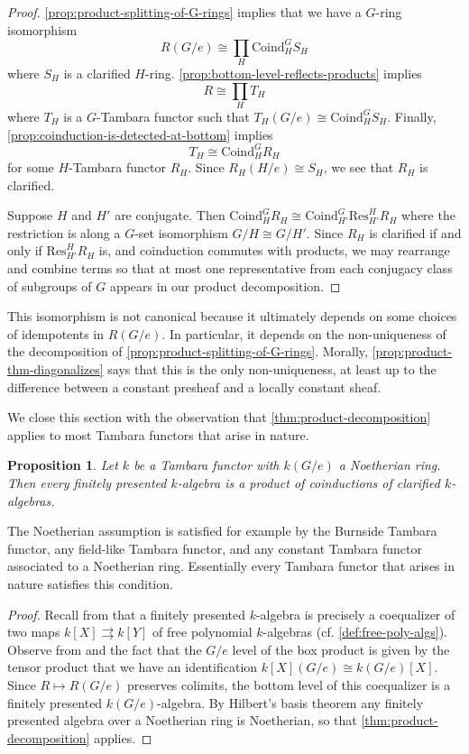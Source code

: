 \documentclass[11pt,dvipsnames]{amsart}
\newtheorem{proposition}[theorem]{Proposition}
\theoremstyle{BoldRemark}
\begin{document}
\begin{proof}
	\cref{prop:product-splitting-of-G-rings} implies that we have a $G$-ring isomorphism \[ R(G/e) \cong \prod_H \mathrm{Coind}_H^G S_H \] where $S_H$ is a clarified $H$-ring. \cref{prop:bottom-level-reflects-products} implies \[ R \cong \prod_H T_H \] where $T_H$ is a $G$-Tambara functor such that $T_H(G/e) \cong \mathrm{Coind}_H^G S_H$. Finally, \cref{prop:coinduction-is-detected-at-bottom} implies \[ T_H \cong \mathrm{Coind}_H^G R_H \] for some $H$-Tambara functor $R_H$. Since $R_H(H/e) \cong S_H$, we see that $R_H$ is clarified.
	
	Suppose $H$ and $H'$ are conjugate. Then $\mathrm{Coind}_H^G R_H \cong \mathrm{Coind}_{H'}^G \mathrm{Res}_{H'}^H R_H$ where the restriction is along a $G$-set isomorphism $G/H \cong G/H'$. Since $R_H$ is clarified if and only if $\mathrm{Res}_{H'}^H R_H$ is, and coinduction commutes with products, we may rearrange and combine terms so that at most one representative from each conjugacy class of subgroups of $G$ appears in our product decomposition.
\end{proof}

This isomorphism is not canonical because it ultimately depends on some choices of idempotents in $R(G/e)$. In particular, it depends on the non-uniqueness of the decomposition of \cref{prop:product-splitting-of-G-rings}. Morally, \cref{prop:product-thm-diagonalizes} says that this is the only non-uniqueness, at least up to the difference between a constant presheaf and a locally constant sheaf.

We close this section with the observation that \cref{thm:product-decomposition} applies to most Tambara functors that arise in nature.

\begin{proposition}\label{prop:main-thm-applies-to-fp-over-noeth-base}
	Let $k$ be a Tambara functor with $k(G/e)$ a Noetherian ring. Then every finitely presented $k$-algebra is a product of coinductions of clarified $k$-algebras.
\end{proposition}

The Noetherian assumption is satisfied for example by the Burnside Tambara functor, any field-like Tambara functor, and any constant Tambara functor associated to a Noetherian ring. Essentially every Tambara functor that arises in nature satisfies this condition.

\begin{proof}
	Recall from \cite{SSW24} that a finitely presented $k$-algebra is precisely a coequalizer of two maps $k[X] \rightrightarrows k[Y]$ of free polynomial $k$-algebras (cf. \cref{def:free-poly-algs}). Observe from \cite{Bru05} and the fact that the $G/e$ level of the box product is given by the tensor product that we have an identification $k[X](G/e) \cong k(G/e)[X]$. Since $R \mapsto R(G/e)$ preserves colimits, the bottom level of this coequalizer is a finitely presented $k(G/e)$-algebra. By Hilbert's basis theorem any finitely presented algebra over a Noetherian ring is Noetherian, so that \cref{thm:product-decomposition} applies.
\end{proof}
\end{document}
